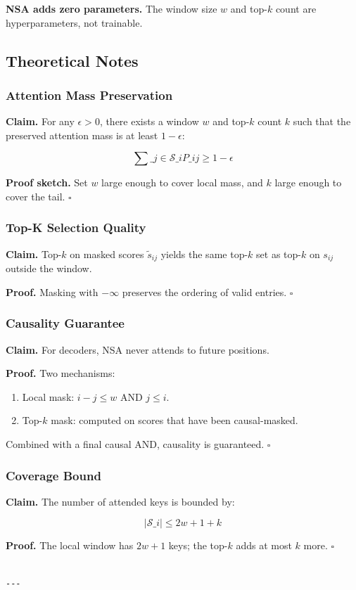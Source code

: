 \textbf{NSA adds zero parameters.} The window size $w$ and top-$k$ count are 
hyperparameters, not trainable.

\subsection{Theoretical Notes}

\subsubsection{Attention Mass Preservation}

\textbf{Claim.} For any $\epsilon > 0$, there exists a window $w$ and top-$k$ 
count $k$ such that the preserved attention mass is at least $1 - \epsilon$:

\[
\sum\_{j \in \mathcal{S}\_i} P\_{ij} \geq 1 - \epsilon
\tag{4.10}
\]

\textbf{Proof sketch.} Set $w$ large enough to cover local mass, and $k$ large 
enough to cover the tail. $\square$

\subsubsection{Top-K Selection Quality}

\textbf{Claim.} Top-$k$ on masked scores $\tilde{s}_{ij}$ yields the same top-$k$ 
set as top-$k$ on $s_{ij}$ outside the window.

\textbf{Proof.} Masking with $-\infty$ preserves the ordering of valid entries. 
$\square$

\subsubsection{Causality Guarantee}

\textbf{Claim.} For decoders, NSA never attends to future positions.

\textbf{Proof.} Two mechanisms:
\begin{enumerate}
\item Local mask: $i - j \leq w$ AND $j \leq i$.
\item Top-$k$ mask: computed on scores that have been causal-masked.

\end{enumerate}
Combined with a final causal AND, causality is guaranteed. $\square$

\subsubsection{Coverage Bound}

\textbf{Claim.} The number of attended keys is bounded by:

\[
|\mathcal{S}\_i| \leq 2w + 1 + k
\tag{4.11}
\]

\textbf{Proof.} The local window has $2w + 1$ keys; the top-$k$ adds at most $k$ 
more. $\square$
\begin{lstlisting}

---
\end{lstlisting}